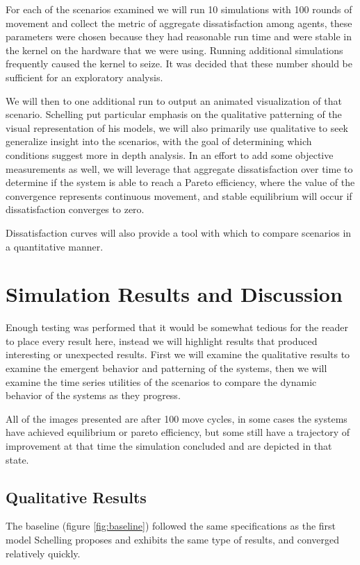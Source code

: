 \documentclass[sigplan,nonacm]{acmart}
\begin{document}
For each of the scenarios examined we will run 10 simulations with 100 rounds of movement and collect the metric
of aggregate dissatisfaction among agents, these parameters were chosen because they had reasonable run time
and were stable in the kernel on the hardware that we were using. 
Running additional simulations frequently caused the kernel to seize.
It was decided that these number should be sufficient for an exploratory analysis.

We will then to one additional run to output an animated visualization of that scenario.
Schelling put particular emphasis on the qualitative patterning of the visual representation of his models,
we will also primarily use qualitative to seek generalize insight into the scenarios, with the goal of 
determining which conditions suggest more in depth analysis.
In an effort to add some objective measurements as well, we will leverage that aggregate dissatisfaction over time
to determine if the system is able to reach a Pareto efficiency, where the value of the convergence represents
continuous movement, and stable equilibrium will occur if dissatisfaction converges to zero.

Dissatisfaction curves will also provide a tool with which to compare scenarios in a quantitative manner.

\section{Simulation Results and Discussion}

Enough testing was performed that it would be somewhat tedious for the reader to place every result here,
instead we will highlight results that produced interesting or unexpected results.
First we will examine the qualitative results to examine the emergent behavior and patterning of the systems,
then we will examine the time series utilities of the scenarios to compare the dynamic behavior of the systems as they progress.

All of the images presented are after 100 move cycles, in some cases the systems have achieved equilibrium or pareto efficiency,
but some still have a trajectory of improvement at that time the simulation concluded and are depicted in that state.

\subsection{Qualitative Results}

The baseline (figure \ref{fig:baseline}) followed the same specifications as the first model Schelling proposes and exhibits the same type of results,
and converged relatively quickly.
\end{document}
